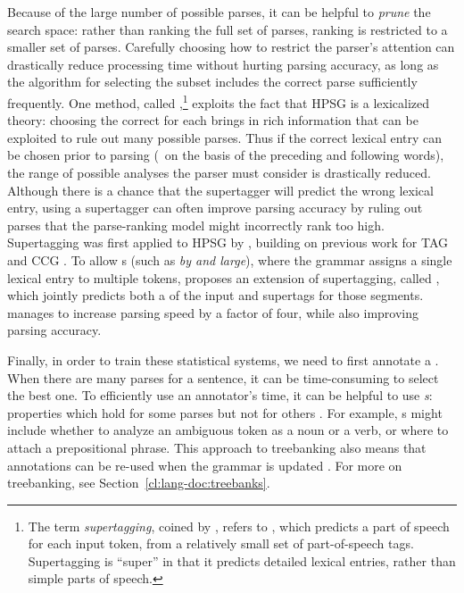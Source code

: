 \documentclass[output=paper
                ,modfonts
                ,nonflat
	        ,collection
	        ,collectionchapter
	        ,collectiontoclongg
 	        ,biblatex
                ,babelshorthands
                ,newtxmath
                ,draftmode
                ,colorlinks, citecolor=brown
]{./langsci/langscibook}
\begin{document}
Because of the large number of possible parses,
it can be helpful to \textit{prune} the search space:
rather than ranking the full set of parses,
ranking is restricted to a smaller set of parses.
Carefully choosing how to restrict the parser's attention 
can drastically reduce processing time without hurting parsing accuracy,
as long as the algorithm for selecting the subset
includes the correct parse sufficiently frequently.
One method, called \textit{},\footnote{%
	The term \textit{supertagging}, coined by \citet{bangalore1999supertag},
	refers to \textit{},
	which predicts a part of speech for each input token,
	from a relatively small set of part-of-speech tags.
	Supertagging is ``super'' in that it predicts detailed lexical entries,
	rather than simple parts of speech.
}
exploits the fact that HPSG is a lexicalized theory:
choosing the correct  for each  brings in rich information
that can be exploited to rule out many possible parses.
Thus if the correct lexical entry can be chosen prior to parsing
(\eg\ on the basis of the preceding and following words),
the range of possible analyses the parser must consider is drastically reduced.
Although there is a chance that the supertagger will predict the wrong lexical entry,
using a supertagger can often improve parsing accuracy
by ruling out parses that the parse-ranking model might incorrectly rank too high.
Supertagging was first applied to HPSG by \citet{matsuzaki2007supertag},
building on previous work for TAG \citep{bangalore1999supertag}
and CCG \citep{clark2004supertag}.
To allow s (such as \textit{by and large}),
where the grammar assigns a single lexical entry to multiple tokens,
\citet{dridan2013ubertag} proposes an extension of supertagging, called \textit{},
which jointly predicts both a  of the input and supertags for those segments.
\citeauthor{dridan2013ubertag} manages to increase parsing speed by a factor of four,
while also improving parsing accuracy.


Finally, in order to train these statistical systems,
we need to first annotate a .
When there are many parses for a sentence,
it can be time-consuming to select the best one.
To efficiently use an annotator's time,
it can be helpful to use \textit{s}:
properties which hold for some parses but not for others \citep{Carter:97}.
For example, s might include
whether to analyze an ambiguous token as a noun or a verb,
or where to attach a prepositional phrase.
This approach to treebanking also means that
annotations can be re-used when the grammar is updated
\citep{OFTM2004a-u,Fli:Oep:Ben:17}.
For more on treebanking, see Section~\ref{cl:lang-doc:treebanks}.%
\end{document}
